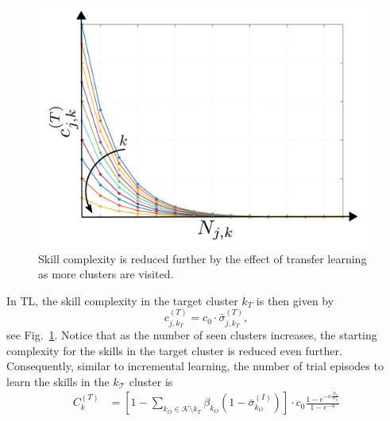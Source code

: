 \begin{figure}[!h]
	\centering
	\includegraphics[width=0.99\columnwidth]{tex/fig/single_transfer_complexity.pdf}
	\caption{Skill complexity is reduced further by the effect of transfer learning as more clusters are visited.}
	\label{fig:single_transfer_complexity}
\end{figure}
In TL, the skill complexity in the target cluster $k_T$ is then given by
\begin{equation}
    c^{(T)}_{j,k_T} = c_0 \cdot \bar{\sigma}^{(T)}_{j,k_T},
\end{equation}
see Fig.~\ref{fig:single_transfer_complexity}. Notice that as the number of seen clusters increases, the starting complexity for the skills in the target cluster is reduced even further. Consequently, similar to incremental learning, the number of trial episodes to learn the skills in the $k_\mathcal{T}$ cluster is
\begin{align}\label{eq:complexity_transfer_single}
	C_{k}^{(T)} &= \left[1 - \sum_{k_O \in \mathcal{K}\setminus k_T}\beta_{k_O} \left(1-\bar{\sigma}^{(I)}_{k_O}\right)\right]  \cdot  c_0 \frac{1 - e^{-\alpha \frac{N_\mathcal{S}}{N_\mathcal{K}}}}{1 - e^{-\alpha}}
\end{align}

